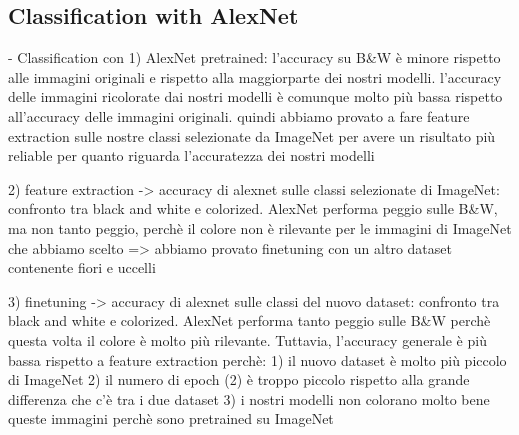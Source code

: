 \subsection{Classification with AlexNet}

- Classification con
1) AlexNet pretrained: l'accuracy su B\&W è minore rispetto alle immagini originali e rispetto alla maggiorparte
dei nostri modelli. l'accuracy delle immagini ricolorate dai nostri modelli è comunque molto più bassa rispetto
all'accuracy delle immagini originali. quindi abbiamo provato a fare feature extraction sulle nostre classi
selezionate da ImageNet per avere un risultato più reliable per quanto riguarda l'accuratezza dei nostri modelli

2) feature extraction -> accuracy di alexnet sulle classi selezionate di ImageNet: confronto tra
black and white e colorized. AlexNet performa peggio sulle B\&W, ma non tanto peggio, perchè il colore non è
rilevante per le immagini di ImageNet che abbiamo scelto => abbiamo provato finetuning con un altro dataset
contenente fiori e uccelli

3) finetuning -> accuracy di alexnet sulle classi del nuovo dataset: confronto tra black and white e colorized.
AlexNet performa tanto peggio sulle B\&W perchè questa volta il colore è molto più rilevante. Tuttavia, l'accuracy
generale è più bassa rispetto a feature extraction perchè:
1) il nuovo dataset è molto più piccolo di ImageNet
2) il numero di epoch (2) è troppo piccolo rispetto alla grande differenza che c'è tra i due dataset
3) i nostri modelli non colorano molto bene queste immagini perchè sono pretrained su ImageNet